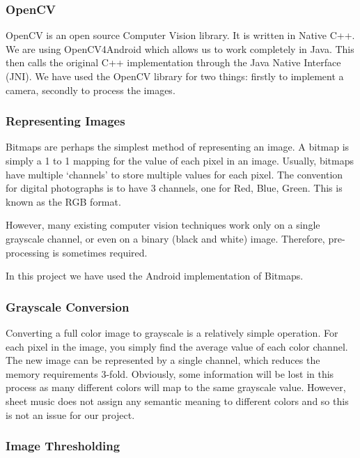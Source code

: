         \subsubsection{OpenCV}
            OpenCV\cite{OpenCV} is an open source Computer Vision library. It is written in Native C++. We are using OpenCV4Android\cite{OpenCV4Android} which allows us to work completely in Java. This then calls the original C++ implementation through the Java Native Interface (JNI)\cite{JNI}. We have used the OpenCV library for two things: firstly to implement a camera, secondly to process the images.

        \subsubsection{Representing Images}

Bitmaps are perhaps the simplest method of representing an image. A bitmap is simply a 1 to 1 mapping for the value of each pixel in an image. Usually, bitmaps have multiple ‘channels’ to store multiple values for each pixel. The convention for digital photographs is to have 3 channels, one for Red, Blue, Green. This is known as the RGB format.

However, many existing computer vision techniques work only on a single grayscale channel, or even on a binary (black and white) image. Therefore, pre-processing is sometimes required.

In this project we have used the Android implementation of Bitmaps\cite{Bitmap}.

        \subsubsection{Grayscale Conversion} \label{sec:grayscale}

Converting a full color image to grayscale is a relatively simple operation. For each pixel in the image, you simply find the average value of each color channel. The new image can be represented by a single channel, which reduces the memory requirements 3-fold. Obviously, some information will be lost in this process as many different colors will map to the same grayscale value. However, sheet music does not assign any semantic meaning to different colors and so this is not an issue for our project.

        \subsubsection{Image Thresholding} \label{sec:threshold}

